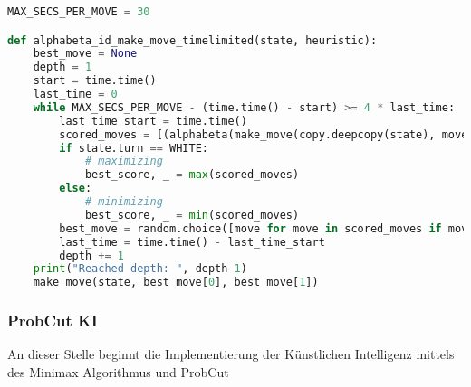 \begin{lstlisting}[language=Python]
MAX_SECS_PER_MOVE = 30

def alphabeta_id_make_move_timelimited(state, heuristic):
    best_move = None
    depth = 1
    start = time.time()
    last_time = 0
    while MAX_SECS_PER_MOVE - (time.time() - start) >= 4 * last_time:
        last_time_start = time.time()
        scored_moves = [(alphabeta(make_move(copy.deepcopy(state), move[0], move[1]), depth-1, -math.inf, math.inf, heuristic), move) for move in state.possible_moves]
        if state.turn == WHITE:
            # maximizing
            best_score, _ = max(scored_moves)
        else:
            # minimizing
            best_score, _ = min(scored_moves)
        best_move = random.choice([move for move in scored_moves if move[0] == best_score])[1]
        last_time = time.time() - last_time_start
        depth += 1
    print("Reached depth: ", depth-1)
    make_move(state, best_move[0], best_move[1])
\end{lstlisting}

\hypertarget{probcut-ki}{%
\subsubsection{ProbCut KI}\label{probcut-ki}}

An dieser Stelle beginnt die Implementierung der Künstlichen Intelligenz
mittels des Minimax Algorithmus und ProbCut

